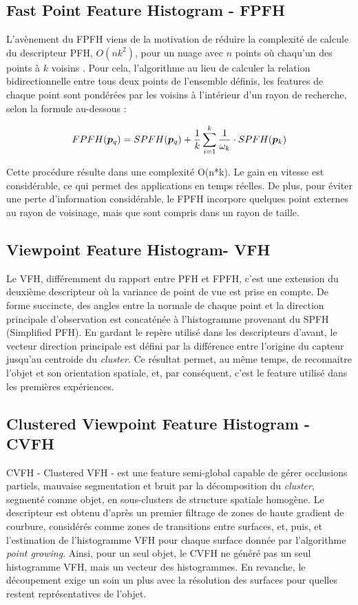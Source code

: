 \subsection{Fast Point Feature Histogram - FPFH}

L'avènement du FPFH viens de la motivation de réduire la complexité de
calcule du descripteur PFH, $ O(nk^2) $, pour un nuage avec $n$ points 
où chaqu'un des points à $k$ voisins . Pour cela, l'algorithme au
lieu de calculer la relation bidirectionnelle entre tous deux points 
de l’ensemble définis, les features de chaque point sont pondérées 
par les voisins à l'intérieur d'un rayon de recherche, selon la formule
au-dessous :

$$FPFH(\boldsymbol{p}_q) = SPFH(\boldsymbol{p}_q) + {1 \over k}
\sum_{i=1}^k {{1 \over \omega_k} \cdot SPFH(\boldsymbol{p}_k)}$$

Cette procédure résulte dans une complexité O(n*k). Le gain en vitesse est considérable,
ce qui permet des applications en temps réelles. De plus, pour éviter une perte d'information considérable, le FPFH
incorpore quelques point externes au rayon de voisinage, mais que sont compris dans un rayon de taille.

\subsection{Viewpoint Feature Histogram- VFH}

Le VFH, différemment du rapport entre PFH et FPFH, c'est une extension
du deuxième descripteur où la variance de point de vue est prise en
compte. De forme succincte, des angles entre la normale de chaque point
et la direction principale d'observation est concaténée à l’histogramme
provenant du SPFH (Simplified PFH). En gardant le repère utilisé dans
les descripteurs d'avant, le vecteur direction principale est défini
par la différence entre l'origine du capteur jusqu'au centroide du
\textit{cluster}. Ce résultat permet, au même temps, de reconnaitre
l'objet et son orientation spatiale, et, par conséquent, c'est le
feature utilisé dans les premières expériences.

\subsection{Clustered Viewpoint Feature Histogram - CVFH} CVFH -
Clustered VFH - est une feature semi-global capable de gérer
occlusions partiels, mauvaise segmentation et bruit par la
décomposition du \textit{cluster}, segmenté comme objet, en sous-clusters de
structure spatiale homogène. Le descripteur est obtenu d'après un premier
filtrage de zones de haute gradient de courbure, considérés comme zones de
transitions entre surfaces, et, puis, et l'estimation de l'histogramme VFH pour chaque surface 
donnée par l'algorithme \textit{point growing}. Ainsi, pour un seul objet, le CVFH ne
généré pas un seul histogramme VFH, mais un vecteur des histogrammes.
En revanche, le découpement exige un soin un plus avec la résolution des surfaces pour
quelles restent représentatives de l'objet.


